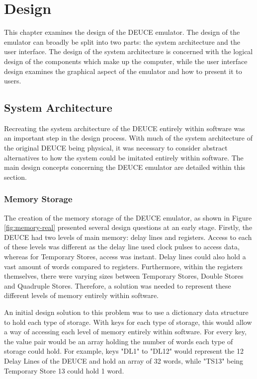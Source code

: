 \documentclass{l4proj}
\begin{document}
\chapter{Design}
This chapter examines the design of the DEUCE emulator. The design of the emulator can broadly be split into two parts: the system architecture and the user interface. The design of the system architecture is concerned with the logical design of the components which make up the computer, while the user interface design examines the graphical aspect of the emulator and how to present it to users.
\section{System Architecture}
Recreating the system architecture of the DEUCE entirely within software was an important step in the design process. With much of the system architecture of the original DEUCE being physical, it was necessary to consider abstract alternatives to how the system could be imitated entirely within software. The main design concepts concerning the DEUCE emulator are detailed within this section.

\subsection{Memory Storage}
The creation of the memory storage of the DEUCE emulator, as shown in Figure \ref{fig:memory-real} presented several design questions at an early stage. Firstly, the DEUCE had two levels of main memory: delay lines and registers. Access to each of these levels was different as the delay line used clock pulses to access data, whereas for Temporary Stores, access was instant. Delay lines could also hold a vast amount of words compared to registers. Furthermore, within the registers themselves, there were varying sizes between Temporary Stores, Double Stores and Quadruple Stores. Therefore, a solution was needed to represent these different levels of memory entirely within software.

An initial design solution to this problem was to use a dictionary data structure to hold each type of storage. With keys for each type of storage, this would allow a way of accessing each level of memory entirely within software. For every key, the value pair would be an array holding the number of words each type of storage could hold. For example, keys "DL1" to "DL12" would represent the 12 Delay Lines of the DEUCE and hold an array of 32 words, while "TS13" being Temporary Store 13 could hold 1 word.
\end{document}
